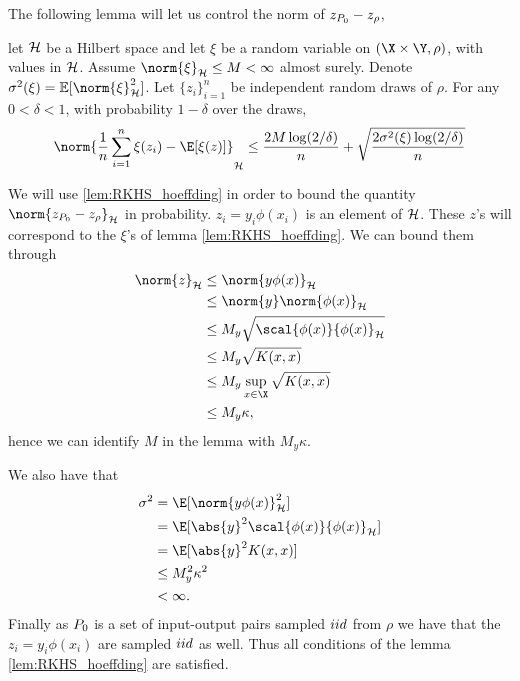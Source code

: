 The following lemma will let us control the norm of \(z_{P_{0}} - z_{\rho}\),
\begin{lemma}
  \label{lem:RKHS_hoeffding}
  let \(\mathcal{H}\) be a Hilbert space and let \(\xi\) be a random variable
  on \((\X \times \Y, \rho)\), with values in \(\mathcal{H}\). Assume
  \(\norm{\xi}_{\rkhs{H}} \leq M < \infty\) almost surely. Denote
  \(\sigma^2(\xi) = \mathbb{E}[\norm{\xi}_{\rkhs{H}}^2]\). Let
  \(\{z_i\}_{i=1}^n\) be independent random draws of \(\rho\). For any \(0 <
  \delta < 1\), with probability \(1 - \delta\) over the draws,
  \begin{equation}
    \label{eq:RKHS_hoeffding_bound}
    \norm{\frac{1}{n}\sum_{i=1}^n\xi(z_i) - \E[\xi(z)]}_{\rkhs{H}} \leq \frac{2 M \log(2/\delta)}{n} + \sqrt{\frac{2 \sigma^2(\xi) \log(2/\delta)}{n}}
  \end{equation}
\end{lemma}

We will use \ref{lem:RKHS_hoeffding} in order to bound the quantity
\(\norm{z_{\poolset_0} - z_{\rho}}_{\rkhs{H}}\) in probability. \(z_{i} = y_{i}
\phi(x_{i})\) is an element of \(\mathcal{H}\). These \(z\)'s will correspond to
the \(\xi\)'s of lemma \ref{lem:RKHS_hoeffding}. We can bound them through
\begin{align*}
  \norm{z}_{\rkhs{H}} & \leq \norm{y \phi(x)}_{\rkhs{H}} \\
                      & \leq \norm{y}\norm{\phi(x)}_{\rkhs{H}} \\
                      & \leq M_y\sqrt{\scal{\phi(x)}{\phi(x)}_{\rkhs{H}}} \\
                      & \leq M_y\sqrt{K(x, x)} \\
                      & \leq M_y \sup_{x \in \X} \sqrt{K(x, x)} \\
                      & \leq M_y \kappa,
\end{align*}
hence we can identify \(M\) in the lemma with \(M_{y}\kappa\).

We also have that
\begin{align*}
  \sigma^2 & = \E[\norm{y \phi(x)}_{\rkhs{H}}^2] \\
           & = \E[\abs{y}^2 \scal{\phi(x)}{\phi(x)}_{\rkhs{H}}] \\
           & = \E[\abs{y}^2 K(x, x)] \\
           & \leq M^2_y \kappa^2 \\
           & < \infty.
\end{align*}
Finally as \(P_{0}\) is a set of input-output pairs sampled \(iid\) from \(\rho\)
we have that the \(z_{i} = y_{i}\phi(x_{i})\) are sampled \(iid\) as well. Thus
all conditions of the lemma \ref{lem:RKHS_hoeffding} are satisfied.

